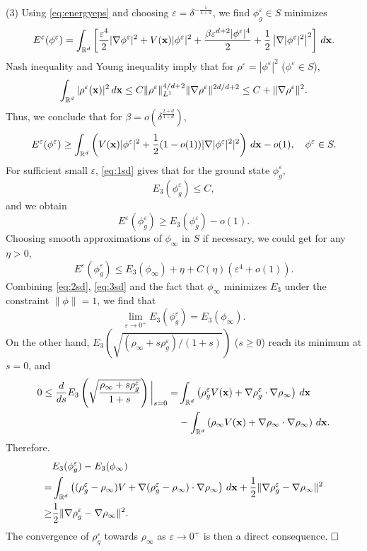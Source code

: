 \documentclass{elsarticle}
\newcommand{\vep}{\varepsilon}
\newcommand{\be}{\begin{equation}}
\newcommand{\ee}{\end{equation}}
\newcommand{\bx}{{\bf x} }
\begin{document}
(3)
Using \eqref{eq:energyeps} and choosing $\vep=\delta^{-\frac{1}{4+d}}$, we find  $\phi_g^\vep\in S$ minimizes
\be
E^\vep(\phi^\vep)=\int_{\Bbb R^d}\left[\frac{\vep^4}{2}|\nabla\phi^\vep|^2+V(\bx)|\phi^\vep|^2+\frac{\beta\vep^{d+2}|\phi^\vep|^4}{2}+\frac{1}{2}\left|\nabla|\phi^\vep|^2\right|^2\right]\,d\bx.
\ee
Nash inequality and Young inequality imply that for $\rho^\vep=|\phi^\vep|^2$ ($\phi^\vep\in S$),
\begin{align*}
\int_{\Bbb R^d}|\rho^\vep(\bx)|^2\,d\bx\leq C\|\rho^\vep\|_{L^1}^{4/d+2}\|\nabla\rho^\vep\|^{2d/d+2}
\leq  C+\|\nabla\rho^\vep\|^2.
\end{align*}
Thus, we conclude that for $\beta=o(\delta^{\frac{2+d}{4+d}})$,
\be\label{eq:1sd}
E^{\vep}(\phi^\vep)\ge \int_{\Bbb R^d}\left(V(\bx)|\phi^\vep|^2+\frac12(1-o(1))|\nabla|\phi^\vep|^2|^2\right)\,d\bx-o(1),\quad
\phi^\vep\in S.
\ee
For sufficient small $\vep$, \eqref{eq:1sd} gives that for the ground state $\phi_g^\vep$,
\be
E_3(\phi_g^\vep)\leq C,
\ee
and we obtain
\be\label{eq:2sd}
E^{\vep}(\phi_g^\vep)\ge E_3(\phi_g^\vep)-o(1).
\ee
Choosing  smooth approximations of $\phi_\infty$ in $S$ if necessary, we  could get for any $\eta>0$,
\be\label{eq:3sd}
E^{\vep}(\phi_g^\vep)\leq E_3(\phi_\infty)+\eta+ C(\eta)(\vep^{4}+o(1)).
\ee
Combining \eqref{eq:2sd}, \eqref{eq:3sd} and the fact that $\phi_\infty$ minimizes $E_3$ under the constraint $\|\phi\|=1$, we find that
\be
\lim\limits_{\vep\to0^+} E_3(\phi_g^\vep)=E_3(\phi_\infty).
\ee
On the other hand,  $E_3(\sqrt{(\rho_\infty+s\rho_g^\vep)/(1+s)})$ ($s\ge0$) reach its minimum at $s=0$, and
\begin{align*}
0\leq\frac{d}{ds}E_3\left(\sqrt{\frac{\rho_\infty+s\rho_g^\vep}{1+s}}\right)\bigg|_{s=0}
=&\int_{\Bbb R^d}\left(\rho_g^\vep V(\bx)+\nabla \rho_g^\vep\cdot\nabla \rho_\infty\right)\,d\bx\\
&-\int_{\Bbb R^d}\left(\rho_\infty V(\bx)+\nabla \rho_\infty\cdot\nabla \rho_\infty\right)\,d\bx.
\end{align*}
Therefore.
\begin{align*}
 &E_3(\phi_g^\vep)-E_3(\phi_\infty)\\
 =& \int_{\Bbb R^d}\left((\rho_g^\vep-\rho_\infty)V+\nabla(\rho_g^\vep-\rho_\infty)\cdot\nabla\rho_\infty\right)\,d\bx+\frac12\|\nabla\rho_g^\vep-\nabla\rho_\infty\|^2\\
 \ge&\frac12\|\nabla\rho_g^\vep-\nabla\rho_\infty\|^2.
\end{align*}
The convergence of $\rho_g^\vep$ towards $\rho_\infty$ as $\vep\to0^+$ is then a direct consequence. $\hfill\Box$
\end{document}
